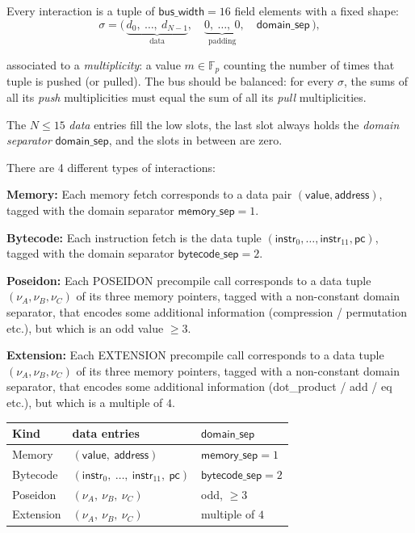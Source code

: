 \documentclass{article}
\theoremstyle{definition}
\newcommand{\Fp}{\mathbb F_p}
\begin{document}
Every interaction is a tuple of $\textsf{bus\_width} = 16$ field elements with a fixed shape:
$$\sigma = \big(\,\underbrace{d_0,\ \dots,\ d_{N-1}}_{\text{data}},\quad \underbrace{0,\ \dots,\ 0}_{\text{padding}},\quad \textsf{domain\_sep}\,\big),$$

associated to a \emph{multiplicity}: a value $m \in \Fp$ counting the number of times that tuple is pushed (or pulled). The bus should be balanced: for every $\sigma$, the sums of all its \emph{push} multiplicities must equal the sum of all its \emph{pull} multiplicities.

The $N \le 15$ \emph{data} entries fill the low slots, the last slot always holds the \emph{domain separator} $\textsf{domain\_sep}$, and the slots in between are zero.



There are 4 different types of interactions:

\textbf{Memory:} Each memory fetch corresponds to a data pair $(\textsf{value}, \textsf{address})$, tagged with the domain separator $\textsf{memory\_sep} = 1$.

\textbf{Bytecode:} Each instruction fetch is the data tuple $(\textsf{instr}_0, \dots, \textsf{instr}_{11}, \textsf{pc})$, tagged with the domain separator $\textsf{bytecode\_sep} = 2$.

\textbf{Poseidon:} Each \textsc{POSEIDON} precompile call corresponds to a data tuple $(\nu_A, \nu_B, \nu_C)$ of its three memory pointers, tagged with a non-constant domain separator, that encodes some additional information (compression / permutation etc.), but which is an odd value $\ge 3$.

\textbf{Extension:} Each \textsc{EXTENSION} precompile call corresponds to a data tuple $(\nu_A, \nu_B, \nu_C)$ of its three memory pointers, tagged with a non-constant domain separator, that encodes some additional information (dot\_product / add / eq etc.), but which is a multiple of $4$.

\begin{center}
\begin{tabular}{lll}
\toprule
Kind & data entries & $\textsf{domain\_sep}$ \\
\midrule
Memory                   & $(\textsf{value},\ \textsf{address})$  & $\textsf{memory\_sep} = 1$ \\
Bytecode                 & $(\textsf{instr}_0,\ \dots,\ \textsf{instr}_{11},\ \textsf{pc})$ & $\textsf{bytecode\_sep} = 2$ \\
Poseidon     & $(\nu_A,\ \nu_B,\ \nu_C)$ & odd, $\ge 3$ \\
Extension & $(\nu_A,\ \nu_B,\ \nu_C)$ & multiple of $4$ \\
\bottomrule
\end{tabular}
\end{center}
\end{document}
